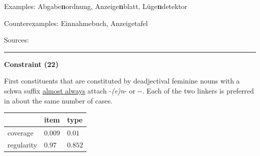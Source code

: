 \vspace{0.3em}

\noindent
Examples: Abgabe\textbf{n}ordnung, Anzeige\textbf{n}blatt, Lüge\textbf{n}detektor

\noindent
Counterexamples: Einnahme{\zeroLinker}buch, Anzeige{\zeroLinker}tafel

\vspace{0.3em}

\noindent
Sources: \citet[93]{ortner_mueller-bollhagen_1991}


\hrule




\vspace{0.4em}

\begin{center}
\textbf{Constraint (22)}
\end{center}

\noindent
First constituents that are constituted by deadjectival feminine nouns with a schwa suffix \underline{almost always} attach -\textit{(e)n}- or \mbox{-{\zeroLinker}-}. Each of the two linkers is preferred in about the same number of cases.
\vspace{0.35em}


\vspace{-0.35em}

\begin{table}[!ht]
\begin{center}

\begin{tabularx}{\columnwidth}{|X|X|X|}
\hline
 & item & type \\
\hline
 coverage & $0.009$ & $0.01$ \\
\hline
 regularity & $0.97$ & $0.852$ \\
\hline
\end{tabularx}
\end{center}
\end{table}

\vspace{-1.35em}

